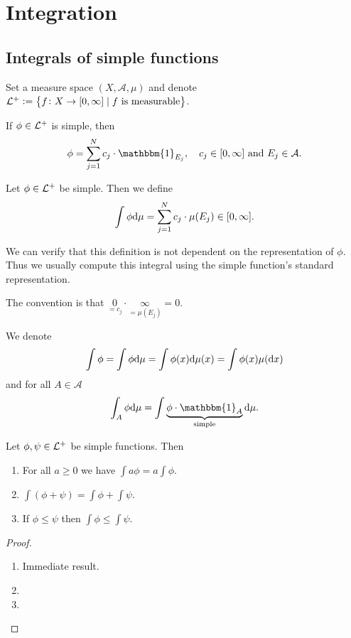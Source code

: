 \documentclass[11pt,a4paper]{article}
\newcommand{\A}{\mathcal A}
\begin{document}
\newpage

\section{Integration}
\subsection{Integrals of simple functions}

Set a measure space $(X,\A,\mu)$ and denote
$\mathcal{L}^+ := \left\{f \colon X \to [0,\infty] \mid \text{$f$ is measurable}\right\}$.
\begin{remark}
  If $\phi \in \mathcal{L}^+$ is simple, then
  \[
    \phi = 
    \sum_{j=1}^{N} c_j \cdot \mathbbm{1}_{E_j}, \quad
    c_j \in [0,\infty] \stand E_j \in \A.
  \]
\end{remark}

\begin{definition}
  Let $\phi \in \mathcal{L}^+$ be simple.
  Then we define
  \[
    \int \phi \mathrm{d} \mu = 
    \sum_{j=1}^{N} c_j \cdot \mu(E_j) \in [0,\infty].
  \]
\end{definition}

\begin{remark}
  We can verify that this definition is not dependent on the representation
  of $\phi$.
  Thus we usually compute this integral using the simple function's
  standard representation.
\end{remark}
\begin{remark}
  The convention is that
  $\underset{=c_j}{0} \cdot \underset{=\mu(E_j)}{\infty} = 0$.
\end{remark}
\begin{remark}
  We denote
  \[
    \int \phi =
    \int \phi \dmu =
    \int \phi(x) \dmu(x) =
    \int \phi(x) \mu(\dx)
  \]
  and for all $A \in \A$ 
  \[
    \int_{A} \phi \dmu =
    \int \underbrace{\phi \cdot \mathbbm{1}_{A}}_{\text{simple}} \dmu.
  \]
\end{remark}

\begin{proposition}
  Let $\phi, \psi \in \mathcal{L}^+$ be simple functions. Then
  \begin{enumerate}
    \item[(1)] For all $a \geq 0$ we have $\int a \phi = a \int \phi$.
    \item[(2)] $\int (\phi + \psi) = \int \phi + \int \psi$.
    \item[(3)] If $\phi \le \psi$ then $\int \phi \le \int \psi$.
  \end{enumerate}
\end{proposition}
\begin{proof} \phantom{}
\begin{enumerate}
  \item[(1)] Immediate result.
  \item[(2)] 
  \item[(2)] 
\end{enumerate}
\end{proof}
\end{document}
